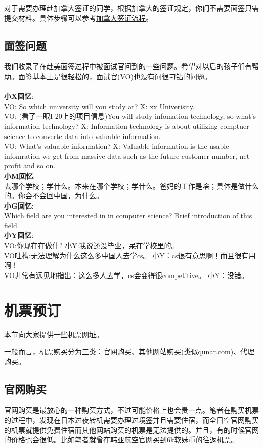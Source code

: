 对于需要办理赴加拿大签证的同学，根据加拿大的签证规定，你们不需要面签只需提交材料。具体步骤可以参考\href{http://www.eduwo.com/canprocess/46765.htm}{加拿大签证流程}。

\subsection{面签问题}
我们收录了在赴美面签过程中被面试官问到的一些问题。希望对以后的孩子们有帮助。面签基本上是很轻松的，面试官(VO)也没有问很刁钻的问题。\\
~\\
\textbf{小X回忆}:\\
VO: So which university will you study at?  X: xx Univerisity.\\
VO: (看了一眼I-20上的项目信息)You will study infomation technology, so what's information technology? X: Information technology is about utilizing comptuer science to converte data into valuable information.\\
VO: What's valuable information? X: Valuable information is the usable infomration we get from massive data such as the future customer number, net profit and so on.\\
\textbf{小M回忆}:\\
去哪个学校；学什么。本来在哪个学校；学什么。爸妈的工作是啥；具体是做什么的。你会不会回中国，为什么。\\
\textbf{小G回忆}:\\
Which field are you interested in in computer science? Brief introduction of this field.\\
\textbf{小Y回忆}:\\
VO:你现在在做什? 小Y:我说还没毕业，呆在学校里的。 \\VO吐槽:无法理解为什么这么多中国人去学cs。 小Y：cs很有意思啊！而且很有用啊！\\VO非常有远见地指出：这么多人去学，cs会变得很competitive。 小Y：没错。

\section{机票预订}
本节向大家提供一些机票网址。\par
一般而言，机票购买分为三类：官网购买、其他网站购买(类似qunar.com)、代理购买。
\subsection{官网购买}
官网购买是最放心的一种购买方式，不过可能价格上也会贵一点。笔者在购买机票的过程中，发现在日本过夜转机需要办理过境签并且需要住宿，而全日空官网购买的机票就提供免费住宿而其他网站购买的机票是无法提供的。并且，有的时候官网的价格也会很低。比如笔者就曾在韩亚航空官网买到6k软妹币的往返机票。
